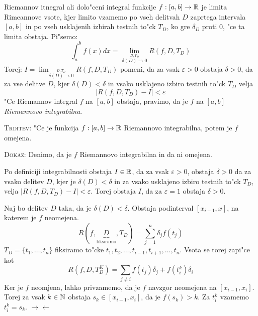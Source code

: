  Riemannov itnegral ali dolo"ceni integral funkcije $f: [a, b] \to \mathbb{R}$ je limita Rimeannove vsote, kjer limito vzamemo po vseh delitvah $D$ zaprtega intervala $[a, b]$ in po vseh usklajenih izbirah testnih to"ck $T_D$, ko gre $\delta_D$ proti 0, "ce ta limita obstaja. Pi"semo:
\begin{equation*}
\int_{a}^{b} f(x) dx = \lim_{\stackrel{D, T_D}{\delta(D) \to 0}} R(f, D, T_D)
\end{equation*}
Torej: $I = \lim_{\stackrel{D, T_D}{\delta(D) \to 0}} R(f, D, T_D)$ pomeni, da za vsak $\varepsilon > 0$ obstaja $\delta > 0$, da za vse delitve $D$, kjer $\delta(D) < \delta$ in vsako usklajeno izbiro testnih to"ck $T_D$ velja
\begin{equation*}
\left| R(f, D, T_D) - I \right| < \varepsilon
\end{equation*}
"Ce Riemannov integral $f$ na $[a, b]$ obstaja, pravimo, da je $f$ na $[a, b]$ \emph{Riemannovo integrabilna}.

\textsc{Trditev:} "Ce je funkcija $f: [a, b] \to \mathbb{R}$ Riemannovo integrabilna, potem je $f$ omejena.

\textsc{Dokaz:} Denimo, da je $f$ Riemannovo integrabilna in da ni omejena. 

Po definiciji integrabilnosti obstaja $I \in \mathbb{R}$, da za vsak $\varepsilon > 0$, obstaja $\delta > 0$ da za vsako delitev $D$, kjer je $\delta(D) < \delta$ in za vsako usklajeno izbiro testnih to"ck $T_D$, velja $|R(f, D, T_D) - I| < \varepsilon$. Torej obstaja $I$, da za $\varepsilon = 1$ obstaja $\delta > 0$.

Naj bo delitev $D$ taka, da je $\delta(D) < \delta$. Obstaja podinterval $[x_{i-1}, x]$, na katerem je $f$ neomejena.
\begin{equation*}
R(f, \underbrace{D}_{\text{fiksiramo}}, T_D) = \sum_{j = 1}^{n} \delta_j f(t_j)
\end{equation*}
$T_D = \{t_1, \ldots, t_n\}$ fiksiramo to"cke $t_1, t_2, \ldots, t_{i-1}, t_{i+1}, \ldots, t_n$. Vsota se torej zapi"ce kot
\begin{equation*}
R(f, D, T_D^K) = \sum_{j \neq i} f(t_j) \delta_j + f(t_i^k)\delta_i
\end{equation*}
Ker je $f$ neomjena, lahko privzamemo, da je $f$ navzgor neomejena na $[x_{i-1}, x_i]$. Torej za vsak $k \in \mathbb{N}$ obstaja $s_k \in [x_{i-1}, x_i]$, da je $f(s_k) > k$. Za $t_i^k$ vzamemo $t_i^k = s_k$. $\rightarrow \leftarrow$

